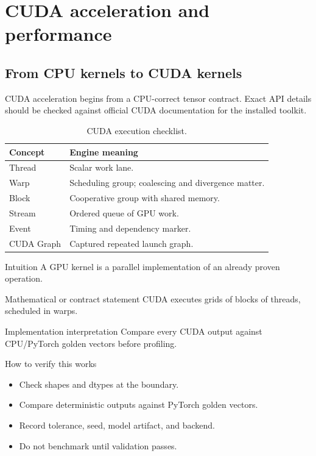 \part{CUDA acceleration and performance}

\chapter{From CPU kernels to CUDA kernels}
\label{ch:cuda-from-cpu}
CUDA acceleration begins from a CPU-correct tensor contract. Exact API details should be checked against official CUDA documentation for the installed toolkit. \citep{cudaProgrammingGuide,cudaArchive,cuda13ReleaseNotes}


\begin{table}[htbp]\centering\small
\begin{tabularx}{\textwidth}{L{0.20\textwidth}Y}
\toprule
Concept & Engine meaning \\
\midrule
Thread & Scalar work lane. \\
Warp & Scheduling group; coalescing and divergence matter. \\
Block & Cooperative group with shared memory. \\
Stream & Ordered queue of GPU work. \\
Event & Timing and dependency marker. \\
CUDA Graph & Captured repeated launch graph. \\
\bottomrule
\end{tabularx}
\caption{CUDA execution checklist.}
\end{table}

\begin{intuitionbox}{Intuition}
A GPU kernel is a parallel implementation of an already proven operation.
\end{intuitionbox}

\begin{definitionbox}{Mathematical or contract statement}
CUDA executes grids of blocks of threads, scheduled in warps.
\end{definitionbox}

\begin{implementationbox}{Implementation interpretation}
Compare every CUDA output against CPU/PyTorch golden vectors before profiling.
\end{implementationbox}

\begin{verificationbox}{How to verify this works}
\begin{itemize}
\item Check shapes and dtypes at the boundary.
\item Compare deterministic outputs against PyTorch golden vectors.
\item Record tolerance, seed, model artifact, and backend.
\item Do not benchmark until validation passes.
\end{itemize}
\end{verificationbox}

